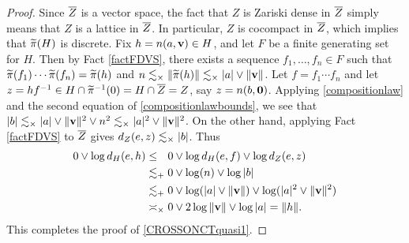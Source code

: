 {\begin{proof}
Since $\overline Z$ is a vector space, the fact that $Z$ is Zariski dense in $\overline Z$ simply means that $Z$ is a lattice in $\overline Z$. In particular, $Z$ is cocompact in $\overline Z$, which implies that $\widetilde\pi(H)$ is discrete. Fix $h = n(a,\mathbf v)\in H$, and let $F$ be a finite generating set for $H$. Then by Fact \ref{factFDVS}, there exists a sequence $f_1,\ldots,f_n\in F$ such that $\widetilde\pi(f_1)\cdots\widetilde\pi(f_n) = \widetilde\pi(h)$ and $n\lesssim_\times \|\widetilde\pi(h)\|\lesssim_\times |a| \vee \|\mathbf v\|$. Let $f = f_1\cdots f_n$ and let $z = h f^{-1} \in H\cap \widetilde\pi^{-1}(0) = H\cap \overline Z = Z$, say $z = n(b,\mathbf 0)$. Applying \eqref{compositionlaw} and the second equation of \eqref{compositionlawbounds}, we see that $|b| \lesssim_\times |a| \vee \|\mathbf v\|^2 \vee n^2 \lesssim_\times |a|^2 \vee \|\mathbf v\|^2$. On the other hand, applying Fact \ref{factFDVS} to $\overline Z$ gives $d_Z(e,z) \lesssim_\times |b|$. Thus
\begin{align*}
0\vee\log\dist_H(e,h) &\leq_\pt 0\vee \log\dist_H(e,f) \vee \log\dist_Z(e,z)\\
&\lesssim_\plus 0\vee \log(n)\vee \log|b|\\
&\lesssim_\plus 0\vee \log(|a|\vee \|\vv\|) \vee \log(|a|^2\vee \|\vv\|^2)\\
&\asymp_\times 0\vee 2\log\|\vv\| \vee \log|a| = \dogo h.
\end{align*}
This completes the proof of \eqref{CROSSONCTquasi1}.
\end{proof}





}
